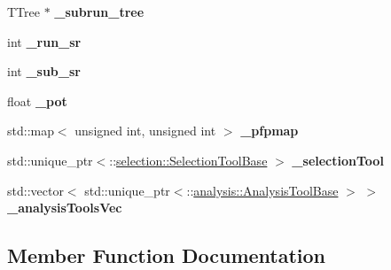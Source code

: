 \begin{DoxyCompactItemize}
\item 
T\+Tree $\ast$ {\bfseries \+\_\+subrun\+\_\+tree}\hypertarget{classNeutrinoSelectionFilter_a6fd2c4dbb3f1d6b4f618bde415bb10a6}{}\label{classNeutrinoSelectionFilter_a6fd2c4dbb3f1d6b4f618bde415bb10a6}

\item 
int {\bfseries \+\_\+run\+\_\+sr}\hypertarget{classNeutrinoSelectionFilter_a057d305cb1ca799934c803b25f95ba33}{}\label{classNeutrinoSelectionFilter_a057d305cb1ca799934c803b25f95ba33}

\item 
int {\bfseries \+\_\+sub\+\_\+sr}\hypertarget{classNeutrinoSelectionFilter_a67a30e788850a2ad92f084403b654e46}{}\label{classNeutrinoSelectionFilter_a67a30e788850a2ad92f084403b654e46}

\item 
float {\bfseries \+\_\+pot}\hypertarget{classNeutrinoSelectionFilter_ab1d8bff6417f53e7fcaaad1762d09c23}{}\label{classNeutrinoSelectionFilter_ab1d8bff6417f53e7fcaaad1762d09c23}

\item 
std\+::map$<$ unsigned int, unsigned int $>$ {\bfseries \+\_\+pfpmap}\hypertarget{classNeutrinoSelectionFilter_a151658388ac5141bb8f1925dbf056bb7}{}\label{classNeutrinoSelectionFilter_a151658388ac5141bb8f1925dbf056bb7}

\item 
std\+::unique\+\_\+ptr$<$\+::\hyperlink{classselection_1_1SelectionToolBase}{selection\+::\+Selection\+Tool\+Base} $>$ {\bfseries \+\_\+selection\+Tool}\hypertarget{classNeutrinoSelectionFilter_ac0b82d00453b3f98cf15961ba7067f62}{}\label{classNeutrinoSelectionFilter_ac0b82d00453b3f98cf15961ba7067f62}

\item 
std\+::vector$<$ std\+::unique\+\_\+ptr$<$\+::\hyperlink{classanalysis_1_1AnalysisToolBase}{analysis\+::\+Analysis\+Tool\+Base} $>$ $>$ {\bfseries \+\_\+analysis\+Tools\+Vec}\hypertarget{classNeutrinoSelectionFilter_a738fc1190d850076e7cd32f000c7e518}{}\label{classNeutrinoSelectionFilter_a738fc1190d850076e7cd32f000c7e518}

\end{DoxyCompactItemize}


\subsection{Member Function Documentation}
